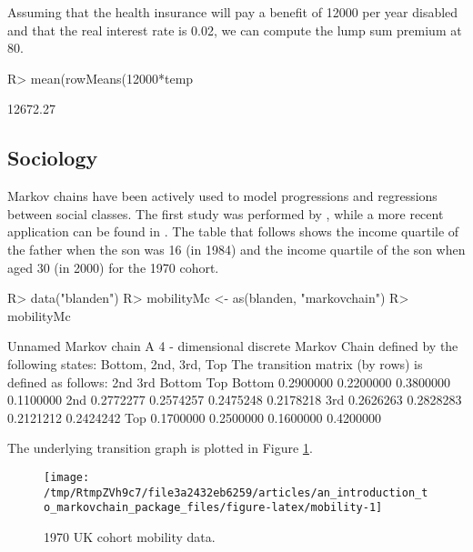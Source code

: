 \documentclass[
  nojss]{jss}
\begin{document}
Assuming that the health insurance will pay a benefit of 12000 per year disabled and that the real interest rate is 0.02, we can compute the lump sum premium at 80.

\begin{CodeChunk}

\begin{CodeInput}
R> mean(rowMeans(12000*temp%
\end{CodeInput}

\begin{CodeOutput}
[1] 12672.27
\end{CodeOutput}
\end{CodeChunk}

\hypertarget{app:sociology}{%
\subsection{Sociology}\label{app:sociology}}

Markov chains have been actively used to model progressions and regressions between social classes. The first study was performed by \cite{glassHall}, while a more recent application can be found in \cite{blandenEtAlii}. The table that follows shows the income quartile of the father when the son was 16 (in 1984) and the income quartile of the son when aged 30 (in 2000) for the 1970 cohort.

\begin{CodeChunk}

\begin{CodeInput}
R> data("blanden")
R> mobilityMc <- as(blanden, "markovchain")
R> mobilityMc
\end{CodeInput}

\begin{CodeOutput}
Unnamed Markov chain 
 A  4 - dimensional discrete Markov Chain defined by the following states: 
 Bottom, 2nd, 3rd, Top 
 The transition matrix  (by rows)  is defined as follows: 
             2nd       3rd    Bottom       Top
Bottom 0.2900000 0.2200000 0.3800000 0.1100000
2nd    0.2772277 0.2574257 0.2475248 0.2178218
3rd    0.2626263 0.2828283 0.2121212 0.2424242
Top    0.1700000 0.2500000 0.1600000 0.4200000
\end{CodeOutput}
\end{CodeChunk}

The underlying transition graph is plotted in Figure \ref{fig:mobility}.

\begin{CodeChunk}
\begin{figure}

{\centering \texttt{[image: /tmp/RtmpZVh9c7/file3a2432eb6259/articles/an\_introduction\_to\_markovchain\_package\_files/figure-latex/mobility-1]} 

}

\caption[1970 UK cohort mobility data]{1970 UK cohort mobility data.}\label{fig:mobility}
\end{figure}
\end{CodeChunk}
\end{document}
